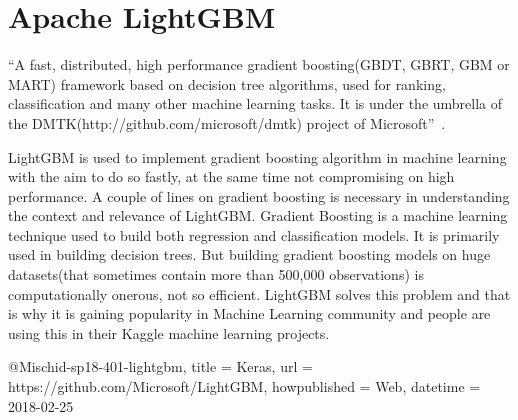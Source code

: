 \section{Apache LightGBM} 

“A fast, distributed, high performance gradient boosting(GBDT, GBRT, GBM or
MART) framework based on decision tree algorithms, used for ranking,
classification and many other machine learning tasks. It is under the
umbrella of the DMTK(http://github.com/microsoft/dmtk) project of
Microsoft”~\cite{hid-sp18-401-lightgbm}. 

LightGBM is used to implement gradient boosting algorithm in
machine learning with the aim to do so fastly, at the same time not compromising
on high performance.  A couple of lines on gradient boosting is necessary in
understanding the context and relevance of LightGBM. Gradient Boosting is a
machine learning technique used to build both regression and classification
models. It is primarily used in building decision trees. But building gradient
boosting models on huge datasets(that sometimes contain more than 500,000
observations) is computationally onerous, not so efficient.  LightGBM solves
this problem and that is why it is gaining popularity in Machine Learning
community and people are using this in their Kaggle machine learning projects.

@Misc{hid-sp18-401-lightgbm, 
title = {Keras}, 
url = {https://github.com/Microsoft/LightGBM}, 
howpublished = {Web}, 
datetime = {2018-02-25} }


